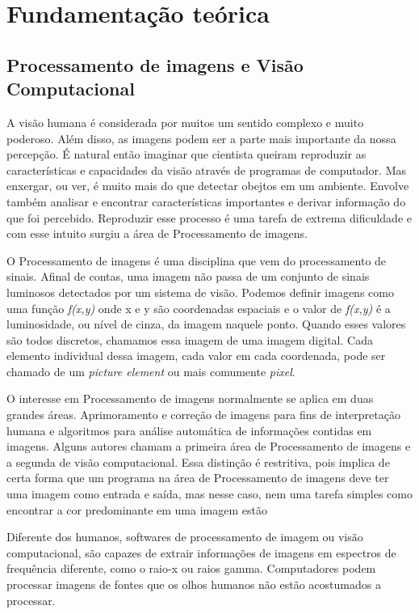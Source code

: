 
\chapter{Fundamentação teórica} \label{processamentoimagens}

\section{Processamento de imagens e Visão Computacional}

    A visão humana é considerada por muitos um sentido complexo e muito poderoso. Além disso, as imagens podem ser a parte mais importante da nossa percepção.  É natural então imaginar que cientista queiram reproduzir as características e capacidades da visão através de programas de computador. Mas enxergar, ou ver, é muito mais do que detectar obejtos em um ambiente. Envolve também analisar e encontrar características importantes e derivar informação do que foi percebido.\cite{graciano2007rastreamento} Reproduzir esse processo é uma tarefa de extrema dificuldade e com esse intuito surgiu a área de Processamento de imagens.

    O Processamento de imagens é uma disciplina que vem do processamento de sinais. Afinal de contas, uma imagem não passa de um conjunto de sinais luminosos detectados por um sistema de visão. Podemos definir imagens como uma função \textit{f(x,y)} onde x e y são coordenadas espaciais e o valor de  \textit{f(x,y)} é a luminosidade, ou nível de cinza, da imagem naquele ponto. Quando esses valores são todos discretos, chamamos essa imagem de uma imagem digital.\cite{gonzalez2009digital} Cada elemento individual dessa imagem, cada valor em cada coordenada, pode ser chamado de um \textit{picture element} ou mais comumente \textit{pixel}.

    O interesse em Processamento de imagens normalmente se aplica em duas grandes áreas. Aprimoramento e correção de imagens para fins de interpretação humana e algoritmos para análise automática de informações contidas em imagens. Alguns autores chamam a primeira área de Processamento de imagens e a segunda de visão computacional. Essa distinção é restritiva, pois implica de certa forma que um programa na área de Processamento de imagens deve ter uma imagem como entrada e saída, mas nesse caso, nem uma tarefa simples como encontrar a cor predominante em uma imagem estão

    Diferente dos humanos, softwares de processamento de imagem ou visão computacional, são capazes de extrair informações de imagens em espectros de frequência diferente, como o raio-x ou raios gamma. Computadores podem processar imagens de fontes que os olhos humanos não estão acostumados a processar.

